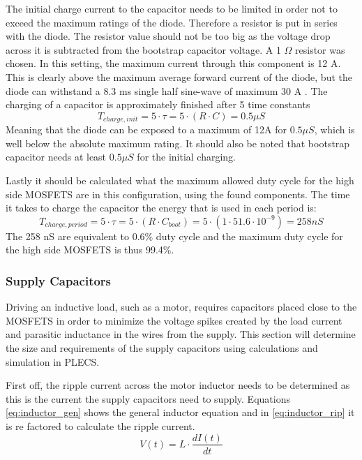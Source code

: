 The initial charge current to the capacitor needs to be limited in order not to exceed the maximum ratings of the diode.
Therefore a resistor is put in series with the diode.
The resistor value should not be too big as the voltage drop across it is subtracted from the bootstrap capacitor voltage.
A 1 $\Omega$ resistor was chosen. In this setting, the maximum current through this component is 12 A.
This is clearly above the maximum average forward current of the diode, but the diode can withstand a 8.3 ms single half sine-wave of maximum 30 A \cite{diode_ds}.
The charging of a capacitor is approximately finished after 5 time constants
\begin{equation}
T_{charge,init} = 5\cdot \tau = 5\cdot (R \cdot C) = 0.5 \mu S 
\end{equation}
Meaning that the diode can be exposed to a maximum of 12A for $0.5 \mu S $, which is well below the absolute maximum rating.
It should also be noted that bootstrap capacitor needs at least $0.5 \mu S $ for the initial charging.

Lastly it should be calculated what the maximum allowed duty cycle for the high side MOSFETS are in this configuration, using the found components.
The time it takes to charge the capacitor the energy that is used in each period is:
\begin{equation}
	T_{charge,period} = 5\cdot \tau = 5\cdot (R \cdot C_{boot}) = 5\cdot (1 \cdot  51.6 \cdot 10^{-9}) = 258 nS 
\end{equation}
The 258 nS are equivalent to 0.6\% duty cycle and the maximum duty cycle for the high side MOSFETS is thus 99.4\%.


\subsubsection{Supply Capacitors}
\label{ssub:sup_caps}
Driving an inductive load, such as a motor, requires capacitors placed close to the MOSFETS in order to minimize the voltage spikes created by the load current and parasitic inductance in the wires from the supply.
This section will determine the size and requirements of the supply capacitors using calculations and simulation in PLECS.

First off, the ripple current across the motor inductor needs to be determined as this is the current the supply capacitors need to supply.
Equations \ref{eq:inductor_gen} shows the general inductor equation and in \ref{eq:inductor_rip} it is re factored to calculate the ripple current.
\begin{equation}
	V(t) = L \cdot \frac{dI(t)}{dt}
	\label{eq:inductor_gen}
\end{equation}

